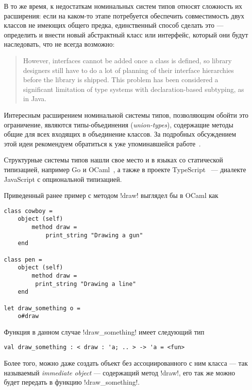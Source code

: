 В то же время, к недостаткам номинальных систем типов относят сложность их
расширения: если на каком-то этапе потребуется обеспечить совместимость двух
классов не имеющих общего предка, единственный способ сделать это --- определить
и внести новый абстрактный класс или интерфейс, который они будут наследовать,
что не всегда возможно:

\begin{quote}
However, interfaces cannot be added once a class is defined, so library
designers still have to do a lot of planning of their interface hierarchies
before the library is shipped. This problem has been considered a significant
limitation of type systems with declaration-based subtyping, as in Java.
\end{quote}

Интересным расширением номинальной системы типов, позволяющим обойти это
ограничение, являются типы-объединения (\emph{union-types}), содержащие методы
общие для всех входящих в объединение классов. За подробных обсуждением этой
идеи рекомендуем обратиться к уже упоминавшейся работе~\cite[]{Igarashi2006}.

Структурные системы типов нашли свое место и в языках со статической
типизацией, например Go и OCaml~\cite[с.~33]{Ocaml}, а также в проекте
TypeScript~\cite[]{TypeScript} --- диалекте JavaScript с опциональной
типизацией. 

Приведенный ранее пример с методом !draw! выглядел бы в OCaml как

\lstset{language=[Objective]Caml}
\begin{lstlisting}
class cowboy =
    object (self)
        method draw =
            print_string "Drawing a gun"
    end

class pen = 
    object (self) 
        method draw =
         print_string "Drawing a line"
    end

let draw_something o =
    o#draw

\end{lstlisting}

Функция в данном случае !draw_something! имеет следующий тип

\begin{lstlisting}
val draw_something : < draw : 'a; .. > -> 'a = <fun>
\end{lstlisting}

Более того, можно даже создать объект без ассоциированного с ним класса --- так
называемый \emph{immediate object} --- содержащий метод !draw!, его так
же можно будет передать в функцию !draw_something!.

